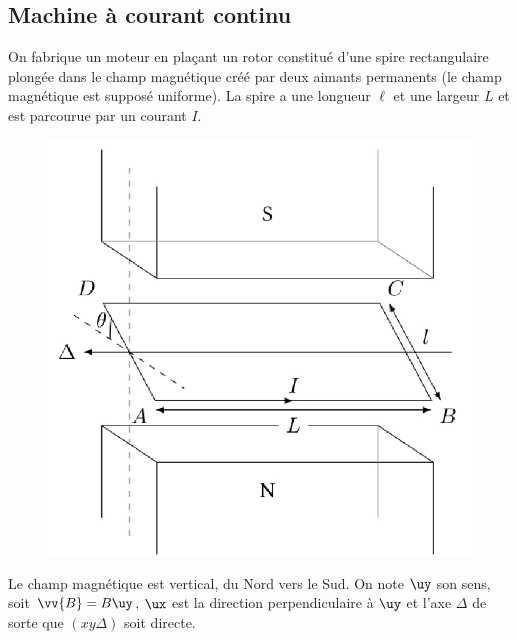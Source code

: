 \documentclass[../../main/main.tex]{subfiles}
\begin{document}
\subsection{Machine à courant continu}
\label{ssec:mcc}
On fabrique un moteur en plaçant un rotor constitué d'une spire rectangulaire
plongée dans le champ magnétique créé par deux aimants permanents (le champ
magnétique est supposé uniforme). La spire a une longueur $\ell $ et une largeur
$L$ et est parcourue par un courant $I$.
\begin{figure}[h]
	\centering
	\includegraphics[scale=1]{mcc}
	\label{fig:mcc}
\end{figure}
Le champ magnétique est vertical, du Nord vers le Sud. On note $\uy$ son sens,
soit $\vv{B} = B\uy$, $\ux$ est la direction perpendiculaire à $\uy$ et l'axe
$\Delta{}$ de sorte que $(xy\Delta)$ soit directe.
\end{document}
